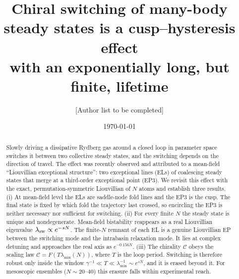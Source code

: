 \documentclass[aps,prl,twocolumn,superscriptaddress,amsmath,amssymb,reprint]{revtex4-2}
\newcommand{\Cc}{\mathcal{C}}
\begin{document}
\title{Chiral switching of many-body steady states is a cusp--hysteresis effect\\ with an exponentially long, but finite, lifetime}

\author{[Author list to be completed]}
\date{\today}

\begin{abstract}
Slowly driving a dissipative Rydberg gas around a closed loop in parameter space switches it between two collective steady states, and the switching depends on the direction of travel. The effect was recently observed and attributed to a mean-field ``Liouvillian exceptional structure'': two exceptional lines (ELs) of coalescing steady states that merge at a third-order exceptional point (EP3). We revisit this effect with the exact, permutation-symmetric Liouvillian of $N$ atoms and establish three results. (i) At mean-field level the ELs are saddle-node fold lines and the EP3 is the cusp. The final state is fixed by which fold the trajectory last crossed, so encircling the EP3 is neither necessary nor sufficient for switching. (ii) For every finite $N$ the steady state is unique and nondegenerate. Mean-field bistability reappears as a real Liouvillian eigenvalue $\lambda_{\rm sw}\propto e^{-sN}$. The finite-$N$ remnant of each EL is a genuine Liouvillian EP between the switching mode and the intrabasin relaxation mode. It lies at complex detuning and approaches the real axis as $e^{-0.156N}$. (iii) The chirality $\Cc$ obeys the scaling law $\Cc=F(T\lambda_{\min}(N))$, where $T$ is the loop period. Switching is therefore robust only inside the window $\gamma^{-1}\ll T\ll\lambda_{\min}^{-1}\sim e^{sN}$, and it is erased beyond it. For mesoscopic ensembles ($N\sim 20$--$40$) this erasure falls within experimental reach.
\end{abstract}

\maketitle
\end{document}
